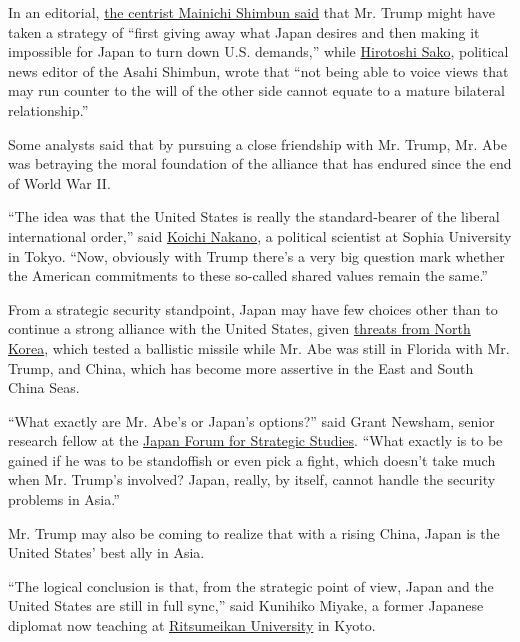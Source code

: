 In an editorial,
\href{http://mainichi.jp/english/articles/20170212/p2a/00m/0na/009000c}{the
centrist Mainichi Shimbun said} that Mr. Trump might have taken a
strategy of ``first giving away what Japan desires and then making it
impossible for Japan to turn down U.S. demands,'' while
\href{http://www.asahi.com/ajw/articles/AJ201702120030.html}{Hirotoshi
Sako}, political news editor of the Asahi Shimbun, wrote that ``not
being able to voice views that may run counter to the will of the other
side cannot equate to a mature bilateral relationship.''

Some analysts said that by pursuing a close friendship with Mr. Trump,
Mr. Abe was betraying the moral foundation of the alliance that has
endured since the end of World War II.

``The idea was that the United States is really the standard-bearer of
the liberal international order,'' said
\href{http://www.fla.sophia.ac.jp/professors/nakanokoichi}{Koichi
Nakano}, a political scientist at Sophia University in Tokyo. ``Now,
obviously with Trump there's a very big question mark whether the
American commitments to these so-called shared values remain the same.''

From a strategic security standpoint, Japan may have few choices other
than to continue a strong alliance with the United States, given
\href{https://www.nytimes3xbfgragh.onion/2017/02/13/world/asia/north-korea-missile-launch-success.html?ref=asia}{threats
from North Korea}, which tested a ballistic missile while Mr. Abe was
still in Florida with Mr. Trump, and China, which has become more
assertive in the East and South China Seas.

``What exactly are Mr. Abe's or Japan's options?'' said Grant Newsham,
senior research fellow at the
\href{http://www.jfss.gr.jp/english/aboutus-en.htm}{Japan Forum for
Strategic Studies}. ``What exactly is to be gained if he was to be
standoffish or even pick a fight, which doesn't take much when Mr.
Trump's involved? Japan, really, by itself, cannot handle the security
problems in Asia.''

Mr. Trump may also be coming to realize that with a rising China, Japan
is the United States' best ally in Asia.

``The logical conclusion is that, from the strategic point of view,
Japan and the United States are still in full sync,'' said Kunihiko
Miyake, a former Japanese diplomat now teaching at
\href{http://en.ritsumei.ac.jp/}{Ritsumeikan University} in Kyoto.

